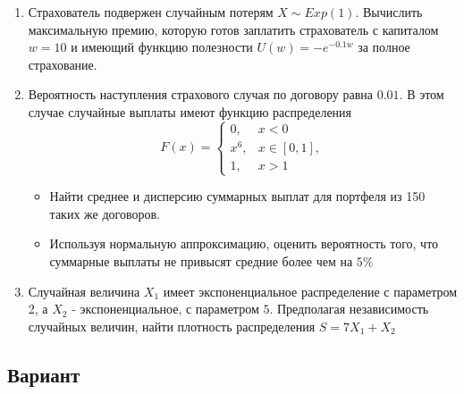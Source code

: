 \documentclass[12pt, letterpaper]{article}
\begin{document}
\begin{enumerate}
	\item 
	
	Страхователь подвержен случайным потерям $X \sim Exp(1)$.
	Вычислить максимальную премию, которую готов заплатить страхователь с капиталом $w=10$ и имеющий функцию полезности $U(w) = -e^{-0.1w}$ за полное страхование.
	
	
	\item
	Вероятность наступления страхового случая по договору равна $0.01$. В этом случае случайные выплаты имеют функцию распределения
	\[
	F(x) = 
	\begin{cases}
		0, & x < 0\\
		x^6, & x \in [0, 1],\\
		1, & x > 1
	\end{cases}
	\]
	\begin{itemize}
		\item Найти среднее и дисперсию суммарных выплат для портфеля из 150 таких же договоров.
		\item Используя нормальную аппроксимацию, оценить вероятность того, что суммарные выплаты не привысят средние более чем на $5\%$
	\end{itemize}
	
	\item
	Случайная величина $X_1$ имеет экспоненциальное распределение с параметром 2, а $X_2$ - экспоненциальное, с параметром $5$.
	Предполагая независимость случайных величин, найти плотность распределения $S = 7X_1 + X_2$
\end{enumerate}


\newpage
\begin{center}
	\section{Вариант}
\end{center}
\end{document}
